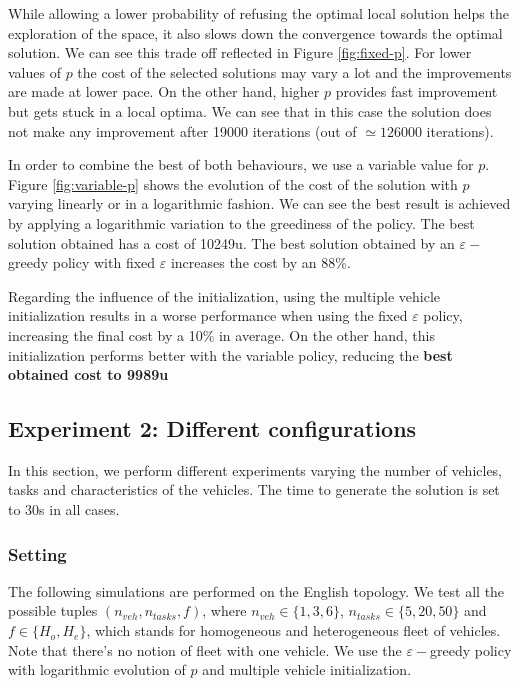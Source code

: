 \documentclass[11pt]{article}
\begin{document}
\begin{minipage}{.6\textwidth}
While allowing a lower probability of refusing the optimal local solution helps the exploration of the space, it also slows down the convergence towards the optimal solution. We can see this trade off reflected in Figure \ref{fig:fixed-p}. For lower values of $p$ the cost of the selected solutions may vary a lot and the improvements are made at lower pace. On the other hand, higher $p$ provides fast improvement but gets stuck in a local optima. We can see that in this case the solution does not make any improvement after 19000 iterations (out of $\simeq 126000$ iterations).

In order to combine the best of both behaviours, we use a variable value for $p$. Figure \ref{fig:variable-p} shows the evolution of the cost of the solution with $p$ varying linearly or in a logarithmic fashion. We can see the best result is achieved by applying a logarithmic variation to the greediness of the policy. The best solution obtained has a cost of 10249u. The best solution obtained by an $\varepsilon-$greedy policy with fixed $\varepsilon$ increases the cost by an 88\%. 

Regarding the influence of the initialization, using the multiple vehicle initialization results in a worse performance when using the fixed $\varepsilon$ policy, increasing the final cost by a 10\% in average. On the other hand, this initialization performs better with the variable policy, reducing the \textbf{best obtained cost to 9989u}  

\end{minipage}


\subsection{Experiment 2: Different configurations}
In this section, we perform different experiments varying the number of vehicles, tasks and characteristics of the vehicles. The time to generate the solution is set to 30s in all cases. 

\subsubsection{Setting}
The following simulations are performed on the English topology. We test all the possible tuples $(n_{veh},n_{tasks},f)$, where $n_{veh} \in \{1, 3, 6\}$,  $n_{tasks} \in \{ 5, 20, 50\}$ and $f\in \{H_o,H_e\}$, which stands for homogeneous and heterogeneous fleet of vehicles. Note that there's no notion of fleet with one vehicle. We use the $\varepsilon-$greedy policy with logarithmic evolution of $p$ and multiple vehicle initialization.
\end{document}
